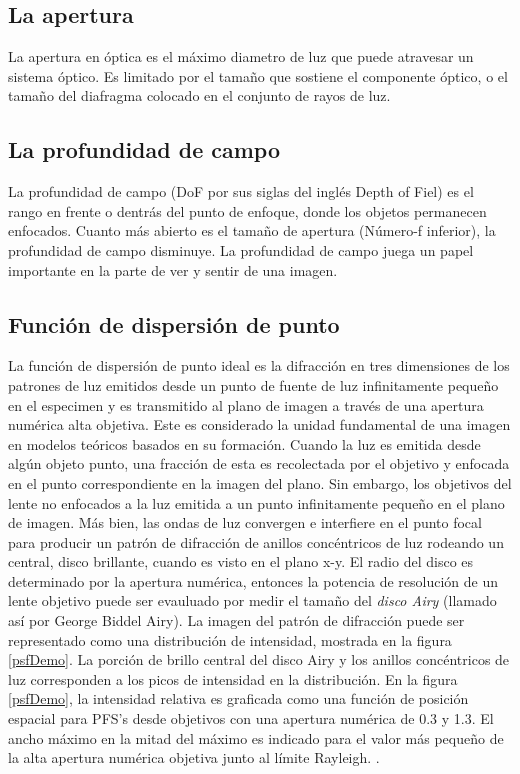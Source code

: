 \subsection{La apertura}
    La apertura en óptica es el máximo diametro de luz que puede atravesar un sistema óptico. Es limitado por el tamaño que sostiene el componente óptico, o el tamaño del diafragma colocado en el conjunto de rayos de luz.\citep{encyclopediabritannica}
\subsection{La profundidad de campo}
    La profundidad de campo (DoF por sus siglas del inglés Depth of Fiel) es el rango en frente o dentrás del punto de enfoque, donde los objetos permanecen enfocados. Cuanto más abierto es el tamaño de apertura (Número-f inferior), la profundidad de campo disminuye. La profundidad de campo juega un papel importante en la parte de ver y sentir de una imagen. \citep{canon_australia_2019}
\subsection{Función de dispersión de punto}
    La función de dispersión de punto ideal es la difracción en tres dimensiones de los patrones de luz emitidos desde un punto de fuente de luz infinitamente pequeño en el especimen y es transmitido al plano de imagen a través de una apertura numérica alta objetiva. Este es considerado la unidad fundamental de una imagen en modelos teóricos basados en su formación. Cuando la luz es emitida desde algún objeto punto, una fracción de esta es recolectada por el objetivo y enfocada en el punto correspondiente en la imagen del plano. Sin embargo, los objetivos del lente no enfocados a la luz emitida a un punto infinitamente pequeño en el plano de imagen. Más bien, las ondas de luz convergen e interfiere en el punto focal para producir un patrón de difracción de anillos concéntricos de luz rodeando un central, disco brillante, cuando es visto en el plano x-y. El radio del disco es determinado por la apertura numérica, entonces la potencia de resolución de un lente objetivo puede ser evauluado por medir el tamaño del \emph{disco Airy} (llamado así por George Biddel Airy). La imagen del patrón de difracción puede ser representado como una distribución de intensidad, mostrada en la figura \ref{psfDemo}. La porción de brillo central del disco Airy y los anillos concéntricos de luz corresponden a los picos de intensidad en la distribución. En la figura \ref{psfDemo}, la intensidad relativa es graficada como una función de posición espacial para PFS's desde objetivos con una apertura numérica de 0.3 y 1.3. El ancho máximo en la mitad del máximo es indicado para el valor más pequeño de la alta apertura numérica objetiva junto al límite Rayleigh. \citep{ruttenfusser_wilson_davidson}.

